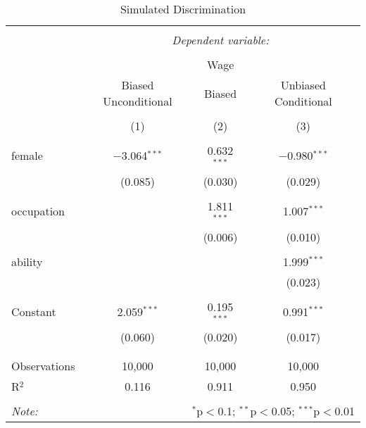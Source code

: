 
\begin{table}[!htbp] \centering 
  \caption{Simulated Discrimination} 
  \label{} 
\begin{tabular}{@{\extracolsep{5pt}}lccc} 
\\[-1.8ex]\hline 
\hline \\[-1.8ex] 
 & \multicolumn{3}{c}{\textit{Dependent variable:}} \\ 
\cline{2-4} 
\\[-1.8ex] & \multicolumn{3}{c}{Wage} \\ 
 & Biased Unconditional & Biased & Unbiased Conditional \\ 
\\[-1.8ex] & (1) & (2) & (3)\\ 
\hline \\[-1.8ex] 
 female & $-$3.064$^{***}$ & 0.632$^{***}$ & $-$0.980$^{***}$ \\ 
  & (0.085) & (0.030) & (0.029) \\ 
  & & & \\ 
 occupation &  & 1.811$^{***}$ & 1.007$^{***}$ \\ 
  &  & (0.006) & (0.010) \\ 
  & & & \\ 
 ability &  &  & 1.999$^{***}$ \\ 
  &  &  & (0.023) \\ 
  & & & \\ 
 Constant & 2.059$^{***}$ & 0.195$^{***}$ & 0.991$^{***}$ \\ 
  & (0.060) & (0.020) & (0.017) \\ 
  & & & \\ 
\hline \\[-1.8ex] 
Observations & 10,000 & 10,000 & 10,000 \\ 
R$^{2}$ & 0.116 & 0.911 & 0.950 \\ 
\hline 
\hline \\[-1.8ex] 
\textit{Note:}  & \multicolumn{3}{r}{$^{*}$p$<$0.1; $^{**}$p$<$0.05; $^{***}$p$<$0.01} \\ 
\end{tabular} 
\end{table} 
